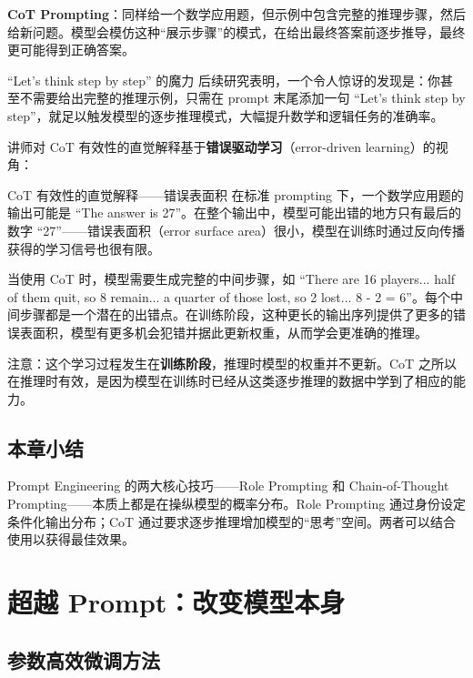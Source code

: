 \documentclass[a4paper]{article}
\begin{document}
\textbf{CoT Prompting}：同样给一个数学应用题，但示例中包含完整的推理步骤，然后给新问题。模型会模仿这种``展示步骤''的模式，在给出最终答案前逐步推导，最终更可能得到正确答案。

\begin{importantbox}{``Let's think step by step'' 的魔力}
后续研究表明，一个令人惊讶的发现是：你甚至不需要给出完整的推理示例，只需在 prompt 末尾添加一句 ``Let's think step by step''，就足以触发模型的逐步推理模式，大幅提升数学和逻辑任务的准确率。
\end{importantbox}

讲师对 CoT 有效性的直觉解释基于\textbf{错误驱动学习}（error-driven learning）的视角：

\begin{knowledgebox}{CoT 有效性的直觉解释——错误表面积}
在标准 prompting 下，一个数学应用题的输出可能是 ``The answer is 27''。在整个输出中，模型可能出错的地方只有最后的数字 ``27''——错误表面积（error surface area）很小，模型在训练时通过反向传播获得的学习信号也很有限。

当使用 CoT 时，模型需要生成完整的中间步骤，如 ``There are 16 players... half of them quit, so 8 remain... a quarter of those lost, so 2 lost... 8 - 2 = 6''。每个中间步骤都是一个潜在的出错点。在训练阶段，这种更长的输出序列提供了更多的错误表面积，模型有更多机会犯错并据此更新权重，从而学会更准确的推理。

注意：这个学习过程发生在\textbf{训练阶段}，推理时模型的权重并不更新。CoT 之所以在推理时有效，是因为模型在训练时已经从这类逐步推理的数据中学到了相应的能力。
\end{knowledgebox}

\subsection{本章小结}

Prompt Engineering 的两大核心技巧——Role Prompting 和 Chain-of-Thought Prompting——本质上都是在操纵模型的概率分布。Role Prompting 通过身份设定条件化输出分布；CoT 通过要求逐步推理增加模型的``思考''空间。两者可以结合使用以获得最佳效果。

\section{超越 Prompt：改变模型本身}

\subsection{参数高效微调方法}
\end{document}
